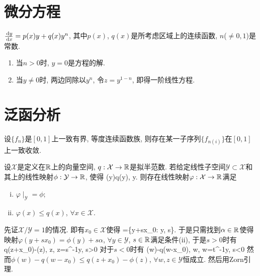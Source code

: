 \newpage
\section{微分方程}
$\frac{\,\mathrm{d} y}{\,\mathrm{d} x}=p(x)y+q(x)y^n$, 其中$p(x)$, $q(x)$是所考虑区域上的连续函数, $n$($\ne0,1$)是常数.
\et
\ba
\begin{enumerate}[(1)]
 \item 当$n>0$时, $y=0$是方程的解.
 \item 当$y\ne 0$时, 两边同除以$y^n$, 令$z=y^{1-n}$, 即得一阶线性方程.
\end{enumerate}

\ea


\newpage
\section{泛函分析}
设$\{f_n\}$是$[0,1]$上一致有界, 等度连续函数族, 则存在某一子序列$\{f_{n(i)}\}$在$[0,1]$上一致收敛.
\et

设$\mathcal X$是定义在$\Bbb R$上的向量空间, $q: \mathcal{X}\to \Bbb R$是拟半范数. 
若给定线性子空间$\mathcal{Y}\subset\mathcal{X}$和其上的线性映射$\phi: \mathcal{Y}\to\Bbb R$, 使得
\bee
\phi(y)\le q(y), \forall y\in{}.
\eee
则存在线性映射$\varphi: \mathcal{X}\to\Bbb R$满足
\begin{enumerate}[(i)]
 \item $\varphi\mid_{\mathcal{Y}}=\phi$;
 \item $\varphi(x)\le q(x)$, $\forall x\in\mathcal{X}$.
\end{enumerate}
\et
\ba
先证$\mathcal{X}/\mathcal{Y}=1$的情况. 即有$x_0\in \mathcal{X}$使得
\bee
{}=\{y+sx_0: y\in{}, s\in{}\}.
\eee
于是只需找到$\alpha\in\Bbb R$使得映射$\varphi(y+sx_0)=\phi(y)+s\alpha$, $\forall y\in\mathcal{Y}$, 
$s\in\Bbb R$满足条件(ii), 于是$s>0$时有
\bee
\alpha\le q(z+x_0)-\phi(z), \forall z\in{}, z=s^{-1}y, s>0
\eee
对于$s<0$时有
\bee
\alpha\ge\phi(w)-q(w-x_0), \forall w\in{}, w=t^{-1}y, s<0
\eee
然而$\phi(w)-q(w-x_0)\le q(z+x_0)-\phi(z)$, $\forall w,z\in\mathcal{Y}$恒成立.
然后用Zorn引理.
\ea

